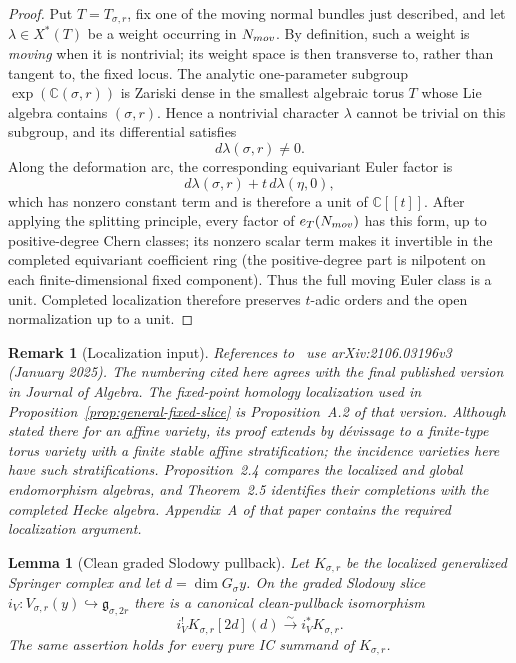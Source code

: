 \documentclass[10pt,a4paper]{amsart}
\newtheorem{lemma}[theorem]{Lemma}
\newtheorem{remark}[theorem]{Remark}
\begin{document}
\begin{proof}
Put $T=T_{\sigma,r}$, fix one of the moving normal bundles just described,
and let
$\lambda\in X^*(T)$ be a weight occurring in $N_{\rm mov}$.  By definition,
such a weight is \emph{moving} when it is nontrivial; its weight space is
then transverse to, rather than tangent to, the fixed locus.  The analytic
one-parameter subgroup $\exp(\mathbb C(\sigma,r))$ is Zariski dense in the
smallest algebraic torus $T$ whose Lie algebra contains $(\sigma,r)$.  Hence
a nontrivial character $\lambda$ cannot be trivial on this subgroup, and its
differential satisfies
\[
 d\lambda(\sigma,r)\ne0.
\]
Along the deformation arc, the corresponding equivariant Euler factor is
\[
 d\lambda(\sigma,r)+t\,d\lambda(\eta,0),
\]
which has nonzero constant term and is therefore a unit of
$\mathbb C[[t]]$.  After applying the splitting principle, every factor of
$e_T(N_{\rm mov})$ has this form, up to positive-degree Chern classes; its
nonzero scalar term makes it invertible in the completed equivariant
coefficient ring (the positive-degree part is nilpotent on each
finite-dimensional fixed component).  Thus the full moving Euler class is a
unit.  Completed
localization therefore preserves $t$-adic orders and the open normalization
up to a unit.
\end{proof}

\begin{remark}[Localization input]
\label{rem:solleveld-version}
References to~\cite{Solleveld} use arXiv:2106.03196v3 (January 2025).  The
numbering cited here agrees with the final published version in
\emph{Journal of Algebra}.  The
fixed-point homology localization used in
Proposition~\ref{prop:general-fixed-slice} is Proposition~A.2 of that
version.  Although stated there for an affine variety, its proof extends by
d\'evissage to a finite-type torus variety with a finite stable affine
stratification; the incidence varieties here have such stratifications.
Proposition~2.4 compares the localized and global endomorphism
algebras, and Theorem~2.5 identifies their completions with the completed
Hecke algebra.  Appendix~A of that paper contains the required localization
argument.
\end{remark}

\begin{lemma}[Clean graded Slodowy pullback]
\label{lem:general-clean-slodowy}
Let $K_{\sigma,r}$ be the localized generalized Springer complex and let
$d=\dim G_\sigma y$.  On the graded Slodowy slice
$i_V:V_{\sigma,r}(y)\hookrightarrow\mathfrak g_{\sigma,2r}$ there is a
canonical clean-pullback isomorphism
\[
 i_V^!K_{\sigma,r}[2d](d)\xrightarrow{\sim}i_V^*K_{\sigma,r}.
\]
The same assertion holds for every pure IC summand of $K_{\sigma,r}$.
\end{lemma}
\end{document}
